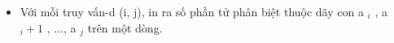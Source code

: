 \begin{itemize}
	\item     Với mỗi truy vấn-d (i, j), in ra số phần tử phân biệt thuộc   dãy con a    $_     i    $    , a    $_     i+1    $    , ...,   a    $_     j    $    trên một dòng.    


\end{itemize}
